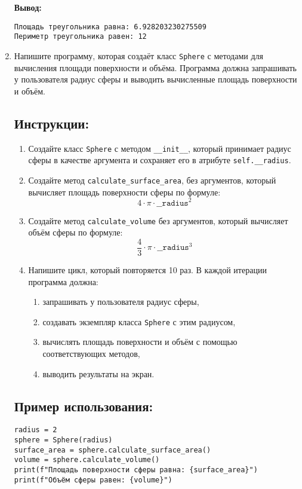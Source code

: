 \begin{enumerate}
\textbf{Вывод:}
\begin{verbatim}
Площадь треугольника равна: 6.928203230275509
Периметр треугольника равен: 12
\end{verbatim}

\item
Напишите программу, которая создаёт класс \texttt{Sphere} с методами для вычисления площади поверхности
и объёма. Программа должна запрашивать у пользователя радиус сферы
и выводить вычисленные площадь поверхности и объём.

\subsection*{Инструкции:}
\begin{enumerate}
\item Создайте класс \texttt{Sphere} с методом
\texttt{\_\_init\_\_}, который принимает радиус сферы в
качестве аргумента и сохраняет его в атрибуте \texttt{self.\_\_radius}.

\item Создайте метод \texttt{calculate\_surface\_area},
без аргументов, который вычисляет площадь поверхности сферы по формуле:
\[
4 \cdot \pi \cdot \texttt{\_\_radius}^2
\]

\item Создайте метод \texttt{calculate\_volume} без аргументов,
который вычисляет объём сферы по формуле:
\[
\frac{4}{3} \cdot \pi \cdot \texttt{\_\_radius}^3
\]

\item Напишите цикл, который повторяется 10 раз. В каждой итерации программа должна:
\begin{enumerate}
\item запрашивать у пользователя радиус сферы,
\item создавать экземпляр класса \texttt{Sphere} с этим радиусом,
\item вычислять площадь поверхности и объём с помощью соответствующих методов,
\item выводить результаты на экран.
\end{enumerate}
\end{enumerate}

\subsection*{Пример использования:}
\begin{verbatim}
radius = 2
sphere = Sphere(radius)
surface_area = sphere.calculate_surface_area()
volume = sphere.calculate_volume()
print(f"Площадь поверхности сферы равна: {surface_area}")
print(f"Объём сферы равен: {volume}")
\end{verbatim}


\end{enumerate}
